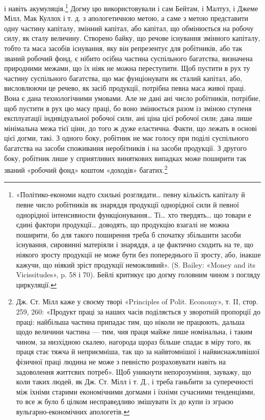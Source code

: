 \parcont{}  %
і навіть акумуляція.\footnote{
«Політико-економи надто схильні розглядати\dots{} певну кількість
капіталу й певне число робітників як знаряддя продукції однорідної
сили й певної однорідної інтенсивности функціонування\dots{} Ті\dots{} хто твердять\dots{}
що товари е єдині фактори продукції\dots{} доводять, що продукцію
взагалі не можна поширити, бо для такого поширення треба б спочатку
збільшити засоби існування, сировинні матеріяли і знаряддя, а це фактично
сходить на те, що ніякого зросту продукції не може бути без попереднього
її зросту, або, інакше кажучи, що ніякий зріст продукції неможливий».
(S. Bailey: «Money and its Vicissitudes», p. 58 і 70). Бейлі
критикує цю догму головним чином з погляду циркуляції.
} Догму цю використовували і сам Бейтам,
і Малтуз, і Джеме Мілл, Мак Куллох і т. д. з апологетичною
метою, а саме з метою представити одну частину капіталу, змінний
капітал, або капітал, що обмінюється на робочу силу, як
сталу величину. Створено байку, що речове існування змінного
капіталу, тобто та маса засобів існування, яку він репрезентує
для робітників, або так званий робочий фонд, є нібито осібна
частина суспільного багатства, визначена природними межами,
що їх ніяк не можна переступити. Щоб пустити в рух ту частину
суспільного багатства, що має фунціонувати як сталий капітал,
або, висловлюючи це речево, як засіб продукції, потрібна
певна маса живої праці. Вона є дана технологічними умовами. Але
не дані ані число робітників, потрібне, щоб пустити в рух цю
масу праці, бо воно змінюється разом із зміною ступеня експлуатації
індивідуальної робочої сили, ані ціна цієї робочої сили;
дана лише мінімальна межа тієї ціни, до того ж дуже еластична.
Факти, що лежать в основі цієї догми, такі. З одного боку, робітник
не має голосу при поділі суспільного багатства на засоби
споживання неробітників і на засоби продукції. З другого
боку, робітник лише у сприятливих виняткових випадках може
поширити так званий «робочий фонд» коштом «доходів» багатих.\footnote{
Дж. Ст. Мілл каже у своєму творі «Principles of Polit. Economy»,
т. II, стор. 259, 260: «Продукт праці за наших часів поділяється у зворотній
пропорції до праці: найбільша частина припадає тим, що ніколи
не працюють, дальша щодо величини частина — тим, чия праця майже
лише номінальна, і таким чином, за низхідною скалею, нагорода щораз
більше спадає в міру того, як праця стає тяжча й неприємніша, так що
за найвтомнішої і найвиснажливішої фізичної праці людина не може з
певністю розраховувати навіть на задоволення життєвих потреб». Щоб
уникнути непорозуміння, зауважу, що коли таких людей, як Дж. Ст.
Мілл і т. Д., і треба ганьбити за суперечності між їхніми старими економічними
догмами і їхніми сучасними тенденціями, то все ж було б цілком
несправедливо змішувати їх до купи із зграєю вульгарно-економічних
апологетів.
}
